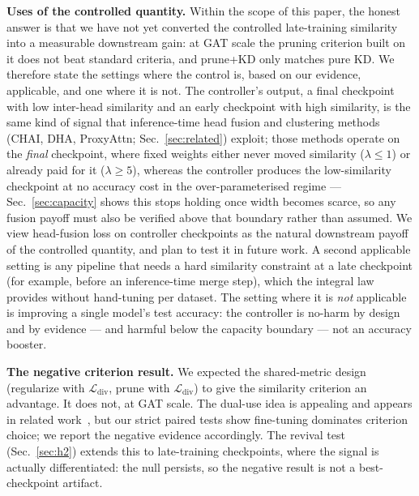 \documentclass{ws-ijprai}
\newcommand{\Ldiv}{\mathcal{L}_{\mathrm{div}}}
\begin{document}
\noindent\textbf{Uses of the controlled quantity.} Within the scope of
this paper, the honest answer is that we have not yet converted the
controlled late-training similarity into a measurable downstream gain: at GAT
scale the pruning criterion built on it does not beat standard criteria, and
prune+KD only matches pure KD. We therefore state the settings where the
control is, based on our evidence, applicable, and one where it is not. The
controller's output, a final checkpoint with low inter-head similarity and
an early checkpoint with high similarity, is the same kind of signal that
inference-time head fusion and clustering methods (CHAI, DHA, ProxyAttn;
Sec.~\ref{sec:related}) exploit; those methods operate on the \emph{final}
checkpoint, where fixed weights either never moved similarity
($\lambda \le 1$) or already paid for it ($\lambda \ge 5$), whereas the
controller produces the low-similarity checkpoint at no accuracy cost in the
over-parameterised regime --- Sec.~\ref{sec:capacity} shows this stops holding
once width becomes scarce, so any fusion payoff must also be verified above
that boundary rather than assumed. We view head-fusion
loss on controller checkpoints as the natural downstream payoff of the
controlled quantity, and plan to test it in future work. A second applicable
setting
is any pipeline that needs a hard similarity constraint at a late checkpoint
(for example, before an inference-time merge step), which the integral law
provides without hand-tuning per dataset. The setting where it is \emph{not}
applicable is improving a single model's test accuracy: the controller is
no-harm by design and by evidence --- and harmful below the capacity boundary
--- not an accuracy booster.

\noindent\textbf{The negative criterion result.} We expected the shared-metric
design (regularize with $\Ldiv$, prune with $\Ldiv$) to give the similarity
criterion an advantage. It does not, at GAT scale. The dual-use idea is
appealing and appears in related work~\cite{deacon2024}, but our strict
paired tests show fine-tuning dominates criterion choice; we report the
negative evidence accordingly. The revival test (Sec.~\ref{sec:h2})
extends this to late-training checkpoints, where the signal is actually
differentiated: the null persists, so the negative result is not a
best-checkpoint artifact.
\end{document}
